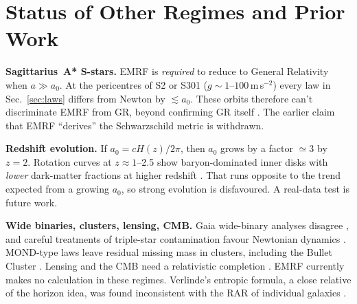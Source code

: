 \documentclass[11pt,a4paper]{article}
\begin{document}
\section{Status of Other Regimes and Prior Work}
\label{sec:other}
\textbf{Sagittarius~A* S-stars.} EMRF is \emph{required} to reduce to General Relativity when $a \gg a_0$. At the pericentres of S2 or S301 ($g \sim 1$--$100$\,m\,s$^{-2}$) every law in Sec.~\ref{sec:laws} differs from Newton by $\lesssim a_0$. These orbits therefore can't discriminate EMRF from GR, beyond confirming GR itself \cite{gravity2018,gravity2020,gravity2022,gravity2026s301}. The earlier claim that EMRF ``derives'' the Schwarzschild metric is withdrawn.

\textbf{Redshift evolution.} If $a_0 = cH(z)/2\pi$, then $a_0$ grows by a factor $\simeq 3$ by $z = 2$. Rotation curves at $z \approx 1$--2.5 show baryon-dominated inner disks with \emph{lower} dark-matter fractions at higher redshift \cite{genzel2017,shachar2023}. That runs opposite to the trend expected from a growing $a_0$, so strong evolution is disfavoured. A real-data test is future work.

\textbf{Wide binaries, clusters, lensing, CMB.} Gaia wide-binary analyses disagree \cite{chae2023,banik2024}, and careful treatments of triple-star contamination favour Newtonian dynamics \cite{banik2024}. MOND-type laws leave residual missing mass in clusters, including the Bullet Cluster \cite{clowe2006,angus2007}. Lensing and the CMB need a relativistic completion \cite{skordis2021}. EMRF currently makes no calculation in these regimes. Verlinde's entropic formula, a close relative of the horizon idea, was found inconsistent with the RAR of individual galaxies \cite{lelli2017verlinde}.
\end{document}
